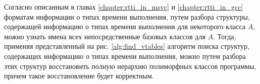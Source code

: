 Согласно описанным в главах \ref{chapter:rtti_in_msvc} и \ref{chapter:rtti_in_gcc} форматам информации о типах времени выполнения, путем разбора структуры, содержащей информацию о типах времени выполнения для некоторого класса $A$, можно узнать имена всех непосредственные базовых классов для $A$. Тогда, применяя представленный на рис. \ref{alg:find_vtables} алгоритм поиска структур, содержащих информацию о типах времени выполнения, можно путем разбора этих структур восстановить полную иерархию полиморфных классов программы, причем такое восстановление будет корректным.























